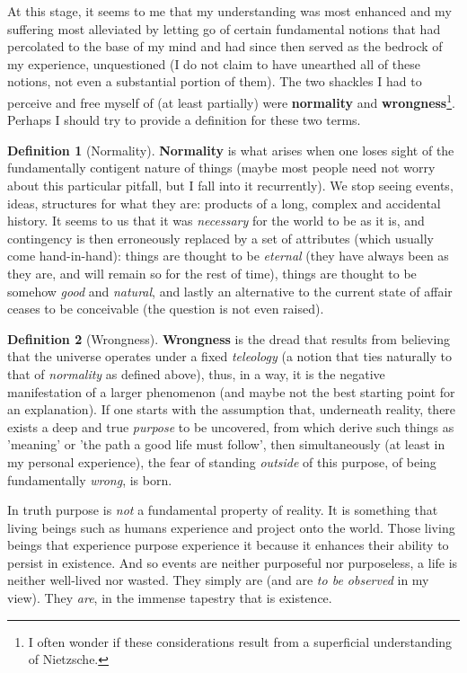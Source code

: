 \documentclass[a4paper,12pt,parskip=half*,chapterprefix=true,numbers=noendperiod]{scrreprt}
\theoremstyle{definition}
\newtheorem{definition}{Definition}[section]
\theoremstyle{remark}
\begin{document}
At this stage, it seems to me that my understanding was most enhanced and my suffering most alleviated by letting go of certain fundamental notions that had percolated to the base of my mind and had since then served as the bedrock of my experience, unquestioned (I do not claim to have unearthed all of these notions, not even a substantial portion of them). The two shackles I had to perceive and free myself of (at least partially) were \textbf{normality} and \textbf{wrongness}\footnote{I often wonder if these considerations result from a superficial understanding of Nietzsche.}. Perhaps I should try to provide a definition for these two terms.
\begin{definition}[Normality]
	\textbf{Normality} is what arises when one loses sight of the fundamentally contigent nature of things (maybe most people need not worry about this particular pitfall, but I fall into it recurrently). We stop seeing events, ideas, structures for what they are: products of a long, complex and accidental history. It seems to us that it was \emph{necessary} for the world to be as it is, and contingency is then erroneously replaced by a set of attributes (which usually come hand-in-hand): things are thought to be \emph{eternal} (they have always been as they are, and will remain so for the rest of time), things are thought to be somehow \emph{good} and \emph{natural}, and lastly an alternative to the current state of affair ceases to be conceivable (the question is not even raised).
\end{definition}
\begin{definition}[Wrongness]
	\textbf{Wrongness} is the dread that results from believing that the universe operates under a fixed \emph{teleology} (a notion that ties naturally to that of \emph{normality} as defined above), thus, in a way, it is the negative manifestation of a larger phenomenon (and maybe not the best starting point for an explanation). If one starts with the assumption that, underneath reality, there exists a deep and true \emph{purpose} to be uncovered, from which derive such things as 'meaning' or 'the path a good life must follow', then simultaneously (at least in my personal experience), the fear of standing \emph{outside} of this purpose, of being fundamentally \emph{wrong}, is born.
\end{definition}

In truth purpose is \emph{not} a fundamental property of reality. It is something that living beings such as humans experience and project onto the world. Those living beings that experience purpose experience it because it enhances their ability to persist in existence. And so events are neither purposeful nor purposeless, a life is neither well-lived nor wasted. They simply are (and are \emph{to be observed} in my view). They \emph{are}, in the immense tapestry that is existence.
\end{document}
